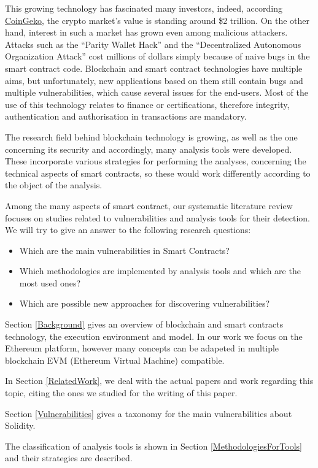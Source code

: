 \documentclass[a4paper,sigconf, language=french,
language=german, language=spanish, language=english]{acmart}
\begin{document}
This growing technology has fascinated many investors, indeed, according \href{https://www.coingecko.com/}{CoinGeko}, 
the crypto market's value is standing around \$2 trillion. 
On the other hand, interest in such a market has grown even among malicious attackers. 
Attacks such as the “Parity Wallet Hack” and the “Decentralized Autonomous Organization Attack” cost millions of dollars simply because of 
naive bugs in the smart contract code. Blockchain and smart contract technologies have multiple aims, but unfortunately, new applications 
based on them still contain bugs and multiple vulnerabilities, which cause 
several issues for the end-users. Most of the use of this technology relates to finance or certifications, therefore integrity, 
authentication and authorisation in transactions are mandatory. 

The research field behind blockchain technology is growing, as well as the one concerning 
its security and accordingly, many analysis tools were developed. 
These incorporate various strategies for performing the analyses, concerning the technical aspects of smart contracts, 
so these would work differently according to the object of the analysis. 

Among the many aspects of smart contract, our systematic
literature review focuses on studies related to vulnerabilities and 
analysis tools for their detection. We will try to give an answer to the following 
research questions:
\begin{itemize}
    \item Which are the main vulnerabilities in Smart Contracts?
    \item Which methodologies are implemented by analysis tools and which are the most used ones?
    \item Which are possible new approaches for discovering vulnerabilities?
\end{itemize}
Section \ref{Background} gives an overview of blockchain and smart contracts technology, the execution environment and model. 
In our work we focus on the Ethereum platform, however many concepts can be adapeted in multiple blockchain EVM (Ethereum Virtual Machine) compatible.

In Section \ref{RelatedWork}, we deal with the actual papers and work regarding this topic, citing the ones we studied for the writing of this paper.

Section \ref{Vulnerabilities} gives a taxonomy for the main vulnerabilities about Solidity. 

The classification of analysis tools is shown in Section \ref{MethodologiesForTools} and their strategies are described.
\end{document}
